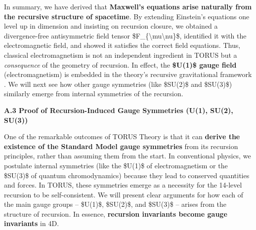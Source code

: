 \documentclass[]{article}
\begin{document}
In summary, we have derived that \textbf{Maxwell's equations arise
naturally from the recursive structure of spacetime}. By extending
Einstein's equations one level up in dimension and insisting on
recursion closure, we obtained a divergence-free antisymmetric field
tensor \$F\_\{\textbackslash{}mu\textbackslash{}nu\}\$, identified it
with the electromagnetic field, and showed it satisfies the correct
field equations​. Thus, classical electromagnetism is not an independent
ingredient in TORUS but a \emph{consequence} of the geometry of
recursion. In effect, the \textbf{\$U(1)\$ gauge field}
(electromagnetism) is embedded in the theory's recursive gravitational
framework​. We will next see how other gauge symmetries (like \$SU(2)\$
and \$SU(3)\$) similarly emerge from internal symmetries of the
recursion.

\textbf{A.3 Proof of Recursion-Induced Gauge Symmetries (U(1), SU(2),
SU(3))}

One of the remarkable outcomes of TORUS Theory is that it can
\textbf{derive the existence of the Standard Model gauge symmetries}
from its recursion principles, rather than assuming them from the start.
In conventional physics, we postulate internal symmetries (like the
\$U(1)\$ of electromagnetism or the \$SU(3)\$ of quantum chromodynamics)
because they lead to conserved quantities and forces. In TORUS, these
symmetries emerge as a necessity for the 14-level recursion to be
self-consistent​. We will present clear arguments for how each of the
main gauge groups -- \$U(1)\$, \$SU(2)\$, and \$SU(3)\$ -- arises from
the structure of recursion. In essence, \textbf{recursion invariants
become gauge invariants} in 4D.
\end{document}
